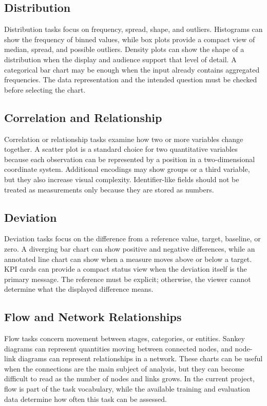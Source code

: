 \subsection{Distribution}

Distribution tasks focus on frequency, spread, shape, and outliers. Histograms can show the frequency of binned values, while box plots provide a compact view of median, spread, and possible outliers. Density plots can show the shape of a distribution when the display and audience support that level of detail. A categorical bar chart may be enough when the input already contains aggregated frequencies. The data representation and the intended question must be checked before selecting the chart.

\subsection{Correlation and Relationship}

Correlation or relationship tasks examine how two or more variables change together. A scatter plot is a standard choice for two quantitative variables because each observation can be represented by a position in a two-dimensional coordinate system. Additional encodings may show groups or a third variable, but they also increase visual complexity. Identifier-like fields should not be treated as measurements only because they are stored as numbers.

\subsection{Deviation}

Deviation tasks focus on the difference from a reference value, target, baseline, or zero. A diverging bar chart can show positive and negative differences, while an annotated line chart can show when a measure moves above or below a target. KPI cards can provide a compact status view when the deviation itself is the primary message. The reference must be explicit; otherwise, the viewer cannot determine what the displayed difference means.

\subsection{Flow and Network Relationships}

Flow tasks concern movement between stages, categories, or entities. Sankey diagrams can represent quantities moving between connected nodes, and node-link diagrams can represent relationships in a network. These charts can be useful when the connections are the main subject of analysis, but they can become difficult to read as the number of nodes and links grows. In the current project, flow is part of the task vocabulary, while the available training and evaluation data determine how often this task can be assessed.

